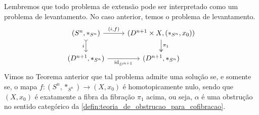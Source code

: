 Lembremos que todo problema de extensão pode ser interpretado como um problema de levantamento.
No caso anterior, temos o problema de levantamento.
\begin{displaymath}
  \begin{tikzcd}
    (S^{n},*_{S^{n}})
    \arrow[d, tail, "i" swap]
    \arrow[r, "{(i,f)}"]
    & (D^{n+1} \times X,(*_{S^{n}},x_{0}))
    \arrow[d, two heads, "\pi_{1}"]
    \\ (D^{n+1},*_{S^{n}})
    \arrow[r, "\id_{D^{n+1}}" swap]
    & (D^{n+1},*_{S^{n}})
  \end{tikzcd}
\end{displaymath}
Vimos no Teorema anterior que tal problema admite uma solução se, e somente se, o mapa $f: (S^{n},*_{S^{n}}) \to (X,x_{0})$ é homotopicamente nulo, sendo que $(X,x_{0})$ é exatamente a fibra da fibração $\pi_{1}$ acima, ou seja, $\alpha$ é uma obstrução no sentido categórico da \cref{defin:teoria_de_obstrucao_para_cofibracao}.



